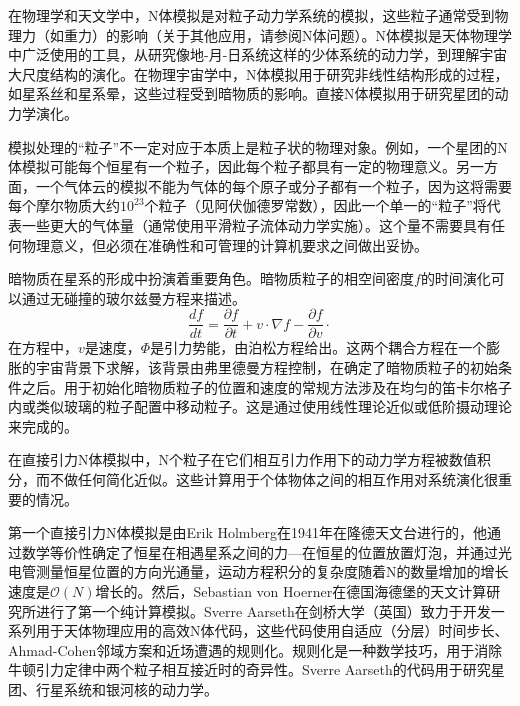 
\begin{issues}
\issueDraft
\end{issues}


在物理学和天文学中，N体模拟是对粒子动力学系统的模拟，这些粒子通常受到物理力（如重力）的影响（关于其他应用，请参阅N体问题）。N体模拟是天体物理学中广泛使用的工具，从研究像地-月-日系统这样的少体系统的动力学，到理解宇宙大尺度结构的演化。在物理宇宙学中，N体模拟用于研究非线性结构形成的过程，如星系丝和星系晕，这些过程受到暗物质的影响。直接N体模拟用于研究星团的动力学演化。

模拟处理的“粒子”不一定对应于本质上是粒子状的物理对象。例如，一个星团的N体模拟可能每个恒星有一个粒子，因此每个粒子都具有一定的物理意义。另一方面，一个气体云的模拟不能为气体的每个原子或分子都有一个粒子，因为这将需要每个摩尔物质大约$10^{23}$个粒子（见阿伏伽德罗常数），因此一个单一的“粒子”将代表一些更大的气体量（通常使用平滑粒子流体动力学实施）。这个量不需要具有任何物理意义，但必须在准确性和可管理的计算机要求之间做出妥协。

暗物质在星系的形成中扮演着重要角色。暗物质粒子的相空间密度$f$的时间演化可以通过无碰撞的玻尔兹曼方程来描述。
\begin{equation}
\frac{df}{dt} = \frac{\partial f}{\partial t} + v\cdot \nabla f - \frac{\partial f}{\partial v}\cdot  
\end{equation}
在方程中，$v$是速度，$\Phi$是引力势能，由泊松方程给出。这两个耦合方程在一个膨胀的宇宙背景下求解，该背景由弗里德曼方程控制，在确定了暗物质粒子的初始条件之后。用于初始化暗物质粒子的位置和速度的常规方法涉及在均匀的笛卡尔格子内或类似玻璃的粒子配置中移动粒子。这是通过使用线性理论近似或低阶摄动理论来完成的。

在直接引力N体模拟中，N个粒子在它们相互引力作用下的动力学方程被数值积分，而不做任何简化近似。这些计算用于个体物体之间的相互作用对系统演化很重要的情况。

第一个直接引力N体模拟是由Erik Holmberg在1941年在隆德天文台进行的，他通过数学等价性确定了恒星在相遇星系之间的力—在恒星的位置放置灯泡，并通过光电管测量恒星位置的方向光通量，运动方程积分的复杂度随着N的数量增加的增长速度是$\mathcal O(N)$增长的。然后，Sebastian von Hoerner在德国海德堡的天文计算研究所进行了第一个纯计算模拟。Sverre Aarseth在剑桥大学（英国）致力于开发一系列用于天体物理应用的高效N体代码，这些代码使用自适应（分层）时间步长、Ahmad-Cohen邻域方案和近场遭遇的规则化。规则化是一种数学技巧，用于消除牛顿引力定律中两个粒子相互接近时的奇异性。Sverre Aarseth的代码用于研究星团、行星系统和银河核的动力学。


